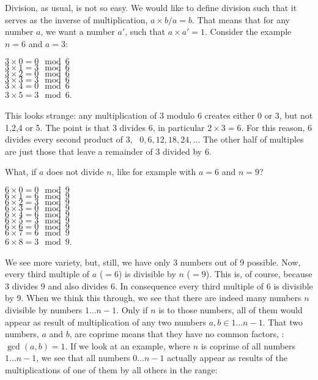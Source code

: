 \documentclass{scrreprt}
\begin{document}
Division, as usual, is not so easy.
We would like to define division such
that it serves as the inverse of multiplication,
\eg\: $a \times b / a = b$. That means
that for any number $a$, we want a number $a'$, such that
$a \times a' = 1$. 
Consider the example $n = 6$ and $a = 3$:

$3 \times 0 = 0 \mod 6$\\
$3 \times 1 = 3 \mod 6$\\
$3 \times 2 = 0 \mod 6$\\
$3 \times 3 = 3 \mod 6$\\
$3 \times 4 = 0 \mod 6$\\
$3 \times 5 = 3 \mod 6$.

This looks strange: any multiplication of 3 modulo 6
creates either 0 or 3, but not 1,2,4 or 5.
The point is that 3 divides 6, in particular $2 \times 3 = 6$.
For this reason, 6 divides every second product of 3,
\ie\ $0, 6, 12, 18, 24, \dots$
The other half of multiples are just those
that leave a remainder of 3 divided by 6.

What, if $a$ does not divide $n$, like for example
with $a = 6$ and $n=9$?

$6 \times 0 = 0 \mod 9$\\
$6 \times 1 = 6 \mod 9$\\
$6 \times 2 = 3 \mod 9$\\
$6 \times 3 = 0 \mod 9$\\
$6 \times 4 = 6 \mod 9$\\
$6 \times 5 = 3 \mod 9$\\
$6 \times 6 = 0 \mod 9$\\
$6 \times 7 = 6 \mod 9$\\
$6 \times 8 = 3 \mod 9$.

We see more variety, but, still, we have only
3 numbers out of 9 possible.
Now, every third multiple of $a$ ($=6$) is divisible by $n$ ($=9$).
This is, of course, because 3 divides 9 and
also divides 6. In consequence every third multiple
of 6 is divisible by 9.
When we think this through, we see that there are indeed
many numbers $n$ divisible by numbers $1\dots n-1$.
Only if $n$ is  to those numbers,
all of them would appear as result
of multiplication of any two numbers 
$a,b \in 1\dots n-1$.
That two numbers, $a$ and $b$, are coprime means
that they have no common factors, 
\ie: $\gcd(a,b) = 1$.
If we look at an example,
where $n$ is coprime of all numbers $1\dots n-1$,
we see that all numbers $0\dots n-1$ actually
appear as results of the multiplications of one of them
by all others in the range:
\end{document}
